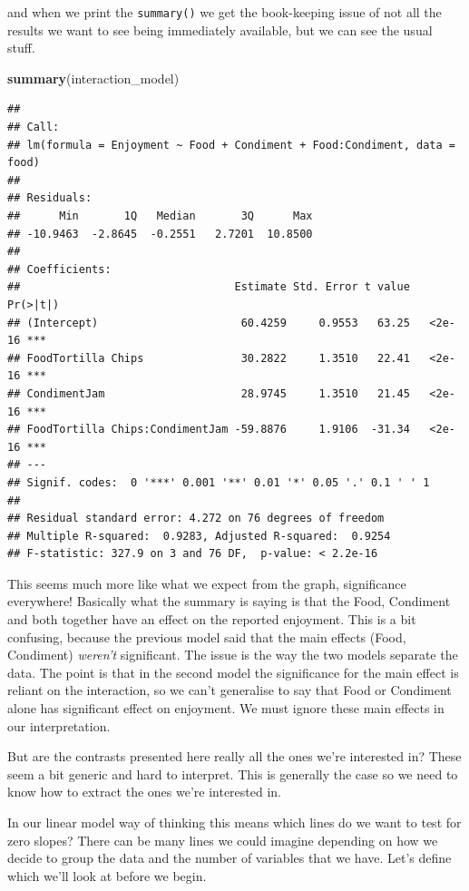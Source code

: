 \documentclass[
]{book}
\newenvironment{Shaded}{\begin{snugshade}}{\end{snugshade}}
\newcommand{\KeywordTok}[1]{\textcolor[rgb]{0.13,0.29,0.53}{\textbf{#1}}}
\newcommand{\NormalTok}[1]{#1}
\begin{document}
and when we print the \texttt{summary()} we get the book-keeping issue of not all the results we want to see being immediately available, but we can see the usual stuff.

\begin{Shaded}
\begin{Highlighting}[]
\KeywordTok{summary}\NormalTok{(interaction_model)}
\end{Highlighting}
\end{Shaded}

\begin{verbatim}
## 
## Call:
## lm(formula = Enjoyment ~ Food + Condiment + Food:Condiment, data = food)
## 
## Residuals:
##      Min       1Q   Median       3Q      Max 
## -10.9463  -2.8645  -0.2551   2.7201  10.8500 
## 
## Coefficients:
##                                 Estimate Std. Error t value Pr(>|t|)    
## (Intercept)                      60.4259     0.9553   63.25   <2e-16 ***
## FoodTortilla Chips               30.2822     1.3510   22.41   <2e-16 ***
## CondimentJam                     28.9745     1.3510   21.45   <2e-16 ***
## FoodTortilla Chips:CondimentJam -59.8876     1.9106  -31.34   <2e-16 ***
## ---
## Signif. codes:  0 '***' 0.001 '**' 0.01 '*' 0.05 '.' 0.1 ' ' 1
## 
## Residual standard error: 4.272 on 76 degrees of freedom
## Multiple R-squared:  0.9283,	Adjusted R-squared:  0.9254 
## F-statistic: 327.9 on 3 and 76 DF,  p-value: < 2.2e-16
\end{verbatim}

This seems much more like what we expect from the graph, significance everywhere! Basically what the summary is saying is that the Food, Condiment and both together have an effect on the reported enjoyment. This is a bit confusing, because the previous model said that the main effects (Food, Condiment) \emph{weren't} significant. The issue is the way the two models separate the data. The point is that in the second model the significance for the main effect is reliant on the interaction, so we can't generalise to say that Food or Condiment alone has significant effect on enjoyment. We must ignore these main effects in our interpretation.

But are the contrasts presented here really all the ones we're interested in? These seem a bit generic and hard to interpret. This is generally the case so we need to know how to extract the ones we're interested in.

In our linear model way of thinking this means which lines do we want to test for zero slopes? There can be many lines we could imagine depending on how we decide to group the data and the number of variables that we have. Let's define which we'll look at before we begin.
\end{document}
